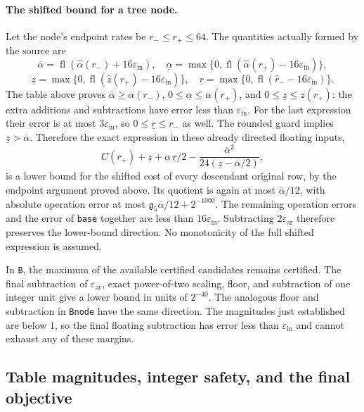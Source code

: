 \paragraph{The shifted bound for a tree node.}
Let the node's endpoint rates be $r_-\le r_+\le64$.
The quantities actually formed by the source are
\[
 \overline\alpha=\operatorname{fl}(\widehat\alpha(r_-)
                 +16\varepsilon_{\mathrm{in}}),\quad
 \underline\alpha=\max\{0,\operatorname{fl}(\widehat\alpha(r_+)
                 -16\varepsilon_{\mathrm{in}})\},
\]
\[
 \underline z=\max\{0,\operatorname{fl}(\widehat z(r_+)
                 -16\varepsilon_{\mathrm{in}})\},\quad
 \underline r=\max\{0,\operatorname{fl}(\widehat r_-
                 -16\varepsilon_{\mathrm{in}})\}.
\]
The table above proves
$\overline\alpha\ge\alpha(r_-)$,
$0\le\underline\alpha\le\alpha(r_+)$, and
$0\le\underline z\le z(r_+)$: the extra additions and subtractions
have error less than $\varepsilon_{\mathrm{in}}$.
For the last expression their error is at most
$3\varepsilon_{\mathrm{in}}$, so $0\le\underline r\le r_-$ as well.
The rounded guard implies $\underline z>\overline\alpha$.
Therefore the exact expression in these already directed floating inputs,
\[
 C(r_+)+\underline z+
 \underline\alpha\,\underline r/2-
 \frac{\overline\alpha^2}
      {24(\underline z-\overline\alpha/2)},
\]
is a lower bound for the shifted cost of every descendant original row,
by the endpoint argument proved above.
Its quotient is again at most $\overline\alpha/12$, with absolute
operation error at most $\mathfrak g_5\overline\alpha/12+2^{-1000}$.  The remaining operation errors and
the error of \texttt{base} together are less than
$16\varepsilon_{\mathrm{in}}$.  Subtracting
$2\varepsilon_{\mathrm{ar}}$ therefore preserves the lower-bound
direction.  No monotonicity of the full shifted expression is assumed.

In \texttt{B}, the maximum of the available certified candidates remains
certified.  The final subtraction of $\varepsilon_{\mathrm{ar}}$, exact
power-of-two scaling, floor, and subtraction of one integer unit give a
lower bound in units of $2^{-40}$.  The analogous floor and subtraction
in \texttt{Bnode} have the same direction.  The magnitudes just established
are below $1$, so the final floating subtraction has error less than
$\varepsilon_{\mathrm{in}}$ and cannot exhaust any of these margins.

\subsection{Table magnitudes, integer safety, and the final objective}
\label{sec:integer-safety}

